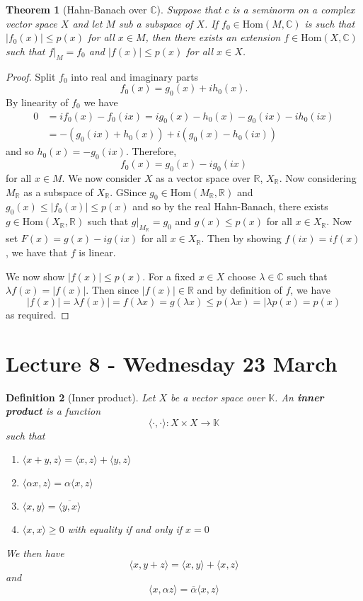 \documentclass[12pt, oneside, a4paper]{article}
\newtheorem{thm}{Theorem}[section]
\theoremstyle{dfn}
\newtheorem{dfn}[thm]{Definition}
\newcommand{\R}{\mathbb{R}}
\newcommand{\K}{\mathbb{K}}
\newcommand{\Com}{\mathbb{C}}
\begin{document}
\begin{thm}[Hahn-Banach over $\Com$]
    Suppose that $c$ is a seminorm on a complex vector space $X$ and let $M$ sub a subspace of $X$.  If $f_0 \in \text{Hom}(M, \Com)$ is such that $|f_0(x) | \leq p(x)$ for all $x \in M$, then there exists an extension $f \in \text{Hom}(X, \Com)$ such that $f|_M = f_0$ and $|f(x)| \leq p(x)$ for all $x \in X$.  
\end{thm} 

\begin{proof}
    Split $f_0$ into real and imaginary parts \[
        f_0(x) = g_0(x) + ih_0(x).
    \]  By linearity of $f_0$ we have \begin{align*}
        0   &= if_0(x) - f_0(ix) = ig_0(x) - h_0(x) - g_0(ix) - ih_0(ix) \\
            &= -(g_0(ix) + h_0(x) ) + i(g_0(x) - h_0(ix))
    \end{align*} and so $h_0(x) = -g_0(ix)$.  Therefore, \[
        f_0(x) = g_0(x) - ig_0(ix)
    \] 
    for all $x \in M$.  We now consider $X$ as a vector space over $\R$, $X_\R$.  Now considering $M_\R$ as a subspace of $X_\R$.  GSince $g_0 \in \text{Hom}(M_\R, \R)$ and $g_0(x) \leq |f_0(x)| \leq p(x)$ and so by the real Hahn-Banach, there exists $g \in \text{Hom}(X_\R, \R)$ such that $g|_{M_\R} = g_0$ and $g(x) \leq p(x)$ for all $x \in X_\R$.  Now set $F(x) = g(x) - ig(ix)$ for all $x \in X_\R$.  Then by showing $f(ix) = if(x)$, we have that $f$ is linear.  
    
    We now show $|f(x)| \leq p(x)$.  For a fixed $x \in X$ choose $\lambda \in \Com$ such that $\lambda f(x) = |f(x)|$.  Then since $|f(x)| \in \R$ and by definition of $f$, we have \[
        |f(x)| = \lambda f(x) | = f(\lambda x) = g(\lambda x) \leq p(\lambda x) = |\lambda p(x) = p(x)
    \] as required.  
 \end{proof}

\section{Lecture 8 - Wednesday 23 March} %
\label{sec:lecture_8_wednesday_23_march}
\begin{dfn}[Inner product]
    Let $X$ be a vector space over $\K$.  
    An \textbf{inner product} is a function \[
    \langle \cdot, \cdot \rangle : X \times X \rightarrow \K 
    \] such that 
    \begin{enumerate}[(1)]
        \item $\langle x + y, z \rangle = \langle x, z \rangle + \langle y, z \rangle$
        \item $\langle \alpha x, z \rangle = \alpha \langle x, z \rangle$
        \item $\langle x, y \rangle = \overline{ \langle y, x \rangle}$
        \item $\langle x, x \rangle \geq 0$ with equality if and only if $x = 0$
    \end{enumerate}
    We then have \[
        \langle x, y + z \rangle = \langle x, y \rangle + \langle x, z \rangle
    \] and \[
        \langle x, \alpha z \rangle = \overline \alpha \langle x, z \rangle
    \]
\end{dfn}
\end{document}
